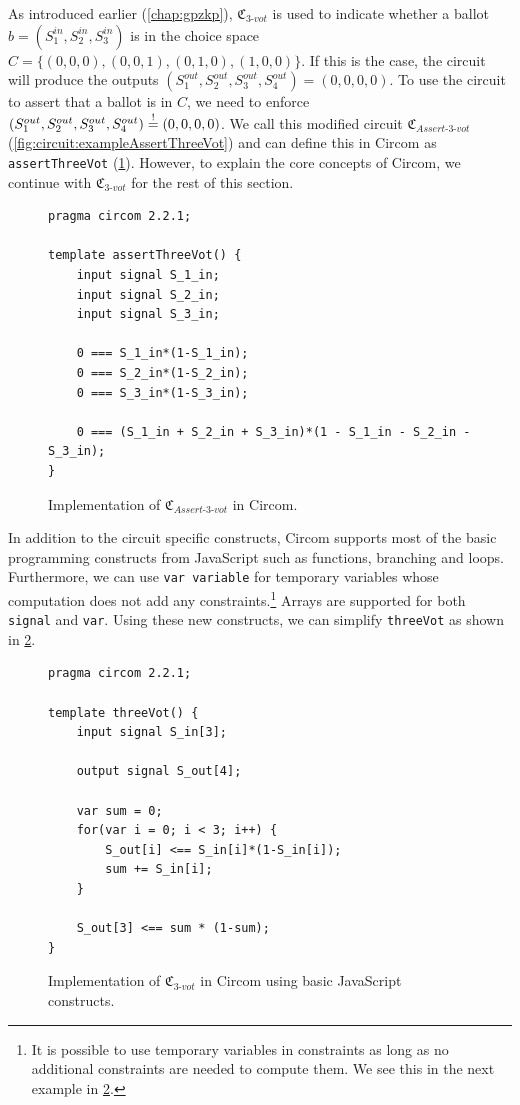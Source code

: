 As introduced earlier (\cref{chap:gpzkp}), $\mathfrak{C}_{3\text{-}vot}$ is used to indicate whether a ballot $b=(S_1^{in}, S_2^{in}, S_3^{in})$ is in the choice space $C=\{(0,0,0), (0,0,1), (0,1,0), (1,0,0)\}$.
If this is the case, the circuit will produce the outputs $(S_1^{out}, S_2^{out}, S_3^{out}, S_4^{out})=(0,0,0,0)$.
To use the circuit to assert that a ballot is in $C$, we need to enforce $(S_1^{out}, S_2^{out}, S_3^{out}, S_4^{out})\overset{!}{=}(0,0,0,0)$.
We call this modified circuit $\mathfrak{C}_{Assert\text{-}3\text{-}vot}$ (\cref{fig:circuit:exampleAssertThreeVot}) and can define this in Circom as \verb|assertThreeVot| (\cref{fig:circom:assertThreeVot}).
However, to explain the core concepts of Circom, we continue with $\mathfrak{C}_{3\text{-}vot}$ for the rest of this section.

\begin{figure}[h]
    \centering
    \captionsetup{type=listing}
    \begin{lstlisting}[language=Circom]
pragma circom 2.2.1;

template assertThreeVot() {
    input signal S_1_in;
    input signal S_2_in;
    input signal S_3_in;

    0 === S_1_in*(1-S_1_in);
    0 === S_2_in*(1-S_2_in);
    0 === S_3_in*(1-S_3_in);

    0 === (S_1_in + S_2_in + S_3_in)*(1 - S_1_in - S_2_in - S_3_in);
}\end{lstlisting}
    \caption{Implementation of $\mathfrak{C}_{Assert\text{-}3\text{-}vot}$ in Circom.}
    \label{fig:circom:assertThreeVot}
\end{figure}

In addition to the circuit specific constructs, Circom supports most of the basic programming constructs from JavaScript such as functions, branching and loops.
Furthermore, we can use \verb|var variable| for temporary variables whose computation does not add any constraints.\footnote{
    \label{footnote:tempVariablesInConstraints}
    It is possible to use temporary variables in constraints as long as no additional constraints are needed to compute them.
    We see this in the next example in \cref{fig:circom:threeVot}.
}
Arrays are supported for both \verb|signal| and \verb|var|.
Using these new constructs, we can simplify \verb|threeVot| as shown in \cref{fig:circom:threeVot}.

\begin{figure}[h]
    \centering
    \captionsetup{type=listing}
    \begin{lstlisting}[language=Circom]
pragma circom 2.2.1;

template threeVot() {
    input signal S_in[3];

    output signal S_out[4];

    var sum = 0;
    for(var i = 0; i < 3; i++) {
        S_out[i] <== S_in[i]*(1-S_in[i]);
        sum += S_in[i];
    }

    S_out[3] <== sum * (1-sum);
}\end{lstlisting}
    \caption{Implementation of $\mathfrak{C}_{3\text{-}vot}$ in Circom using basic JavaScript constructs.}
    \label{fig:circom:threeVot}
\end{figure}

